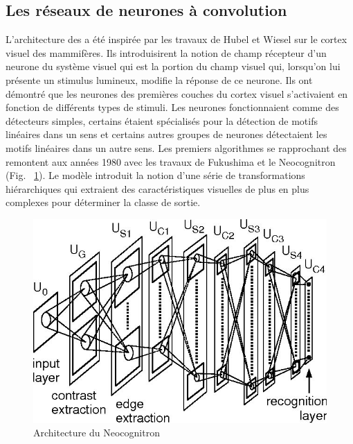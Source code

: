 \subsection{Les réseaux de neurones à convolution}

L'architecture des \acrconvnet a été inspirée par les travaux de Hubel et Wiesel \cite{hubel1962receptive} sur le cortex visuel des mammifères.  Ils introduisirent la notion de champ récepteur d'un neurone du système visuel qui est la portion du champ visuel qui, lorsqu'on lui présente un stimulus lumineux, modifie la réponse de ce neurone.  Ils ont démontré que les neurones des premières couches du cortex visuel s'activaient en fonction de différents types de stimuli. Les neurones fonctionnaient comme des détecteurs simples, certains étaient spécialisés pour la détection de motifs linéaires dans un sens et certains autres groupes de neurones détectaient les motifs linéaires dans un autre sens. Les premiers algorithmes se rapprochant des \acrconvnet remontent aux années 1980 avec les travaux de Fukushima \cite{Fukushima1980} et le Neocognitron (Fig. ~\ref{fig:neocognitron-architecture-diagram}).  Le modèle introduit la notion d'une série de transformations hiérarchiques qui extraient des caractéristiques visuelles de plus en plus complexes pour déterminer la classe de sortie. %

\begin{figure}[!htbp] 
  \includegraphics[width=0.60\linewidth]{figures/neocognitron.jpg}
  \centering
  \caption{\small{Architecture du Neocognitron \cite{Fukushima1980} }}
  \label{fig:neocognitron-architecture-diagram}
\end{figure}

